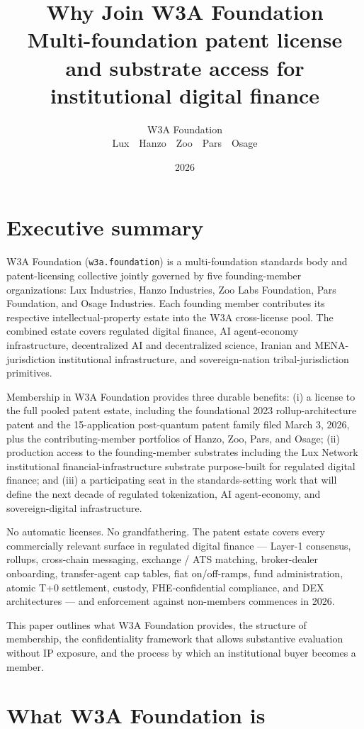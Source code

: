 \documentclass[11pt,letterpaper]{article}
\title{Why Join W3A Foundation\\Multi-foundation patent license and substrate access for institutional digital finance}
\author{W3A Foundation\\\small Lux \,\textperiodcentered\, Hanzo \,\textperiodcentered\, Zoo \,\textperiodcentered\, Pars \,\textperiodcentered\, Osage}
\date{2026}
\begin{document}
\luxcoverpage

\section*{Executive summary}

W3A Foundation (\texttt{w3a.foundation}) is a multi-foundation standards body and patent-licensing collective jointly governed by five founding-member organizations: Lux Industries, Hanzo Industries, Zoo Labs Foundation, Pars Foundation, and Osage Industries. Each founding member contributes its respective intellectual-property estate into the W3A cross-license pool. The combined estate covers regulated digital finance, AI agent-economy infrastructure, decentralized AI and decentralized science, Iranian and MENA-jurisdiction institutional infrastructure, and sovereign-nation tribal-jurisdiction primitives.

Membership in W3A Foundation provides three durable benefits: (i) a license to the full pooled patent estate, including the foundational 2023 rollup-architecture patent and the 15-application post-quantum patent family filed March 3, 2026, plus the contributing-member portfolios of Hanzo, Zoo, Pars, and Osage; (ii) production access to the founding-member substrates including the Lux Network institutional financial-infrastructure substrate purpose-built for regulated digital finance; and (iii) a participating seat in the standards-setting work that will define the next decade of regulated tokenization, AI agent-economy, and sovereign-digital infrastructure.

No automatic licenses. No grandfathering. The patent estate covers every commercially relevant surface in regulated digital finance --- Layer-1 consensus, rollups, cross-chain messaging, exchange / ATS matching, broker-dealer onboarding, transfer-agent cap tables, fiat on/off-ramps, fund administration, atomic T+0 settlement, custody, FHE-confidential compliance, and DEX architectures --- and enforcement against non-members commences in 2026.

This paper outlines what W3A Foundation provides, the structure of membership, the confidentiality framework that allows substantive evaluation without IP exposure, and the process by which an institutional buyer becomes a member.

\section{What W3A Foundation is}
\end{document}
